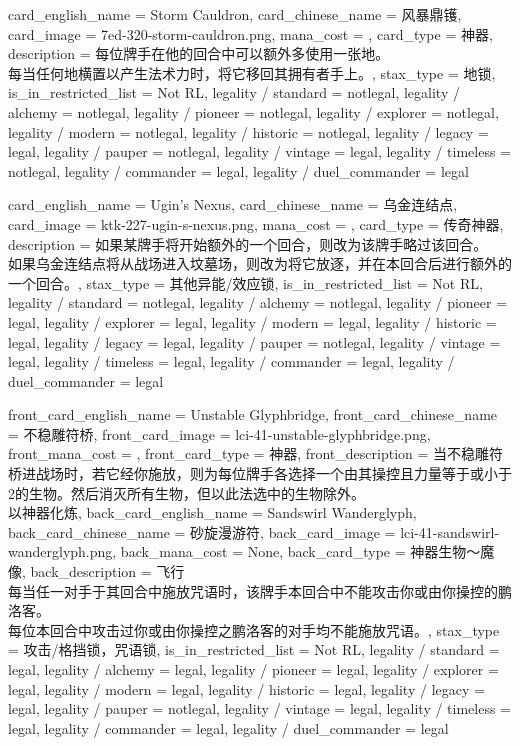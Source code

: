 \documentclass[lang = cn, color = black, 10pt]{AllThatStax}
\begin{document}
\card
{
	card_english_name = {Storm Cauldron},
	card_chinese_name = {风暴鼎镬},
	card_image = 7ed-320-storm-cauldron.png,
	mana_cost = ,
	card_type = 神器,
	description = {每位牌手在他的回合中可以额外多使用一张地。\\
每当任何地横置以产生法术力时，将它移回其拥有者手上。},
	stax_type = 地锁,
	is_in_restricted_list = Not RL,
	legality / standard = notlegal,
	legality / alchemy = notlegal,
	legality / pioneer = notlegal,
	legality / explorer = notlegal,
	legality / modern = notlegal,
	legality / historic = notlegal,
	legality / legacy = legal,
	legality / pauper = notlegal,
	legality / vintage = legal,
	legality / timeless = notlegal,
	legality / commander = legal,
	legality / duel_commander = legal
}

\card
{
	card_english_name = {Ugin's Nexus},
	card_chinese_name = {乌金连结点},
	card_image = ktk-227-ugin-s-nexus.png,
	mana_cost = ,
	card_type = 传奇神器,
	description = {如果某牌手将开始额外的一个回合，则改为该牌手略过该回合。\\
如果乌金连结点将从战场进入坟墓场，则改为将它放逐，并在本回合后进行额外的一个回合。},
	stax_type = 其他异能/效应锁,
	is_in_restricted_list = Not RL,
	legality / standard = notlegal,
	legality / alchemy = notlegal,
	legality / pioneer = legal,
	legality / explorer = legal,
	legality / modern = legal,
	legality / historic = legal,
	legality / legacy = legal,
	legality / pauper = notlegal,
	legality / vintage = legal,
	legality / timeless = legal,
	legality / commander = legal,
	legality / duel_commander = legal
}

\mfcard
{
	front_card_english_name = {Unstable Glyphbridge},
	front_card_chinese_name = {不稳雕符桥},
	front_card_image = lci-41-unstable-glyphbridge.png,
	front_mana_cost = ,
	front_card_type = 神器,
	front_description = {当不稳雕符桥进战场时，若它经你施放，则为每位牌手各选择一个由其操控且力量等于或小于2的生物。然后消灭所有生物，但以此法选中的生物除外。\\
以神器化炼},
	back_card_english_name = {Sandswirl Wanderglyph},
	back_card_chinese_name = {砂旋漫游符},
	back_card_image = lci-41-sandswirl-wanderglyph.png,
	back_mana_cost = None,
	back_card_type = 神器生物～魔像,
	back_description = {飞行\\
每当任一对手于其回合中施放咒语时，该牌手本回合中不能攻击你或由你操控的鹏洛客。\\
每位本回合中攻击过你或由你操控之鹏洛客的对手均不能施放咒语。},
	stax_type = 攻击/格挡锁，咒语锁,
	is_in_restricted_list = Not RL,
	legality / standard = legal,
	legality / alchemy = legal,
	legality / pioneer = legal,
	legality / explorer = legal,
	legality / modern = legal,
	legality / historic = legal,
	legality / legacy = legal,
	legality / pauper = notlegal,
	legality / vintage = legal,
	legality / timeless = legal,
	legality / commander = legal,
	legality / duel_commander = legal
}
\end{document}
